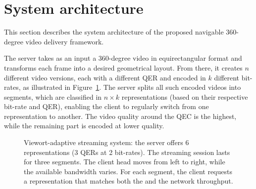 \section{System architecture}

%    

This section describes the system architecture of the proposed
navigable $360$-degree video delivery framework.

The server takes as an input a $360$-degree video in
equirectangular format and transforms each frame into a desired
geometrical layout. From there, it creates $n$ different video
versions, each with a different \ac{QER} and encoded in $k$ different
bit-rates, as illustrated in Figure~\ref{fig:newdelivery}. The server
splits all such encoded videos into segments, which are classified in
$n\!\times\!k$ representations (based on their respective bit-rate and
\ac{QER}), enabling the client to regularly switch from one
representation to another. The video quality around the
\ac{QEC} is the highest, while the remaining part is encoded at lower
quality.

\begin{figure}
   \centering
   
   \caption{Viewort-adaptive streaming system: the server offers \num{6} representations (\num{3} \acp{QER} at \num{2} bit-rates). The streaming session lasts for three segments. The client head moves from left to right, while the available bandwidth varies. For each segment, the client requests a representation that matches both the \FoV{} and the network throughput.}
   \label{fig:newdelivery}
\end{figure}

